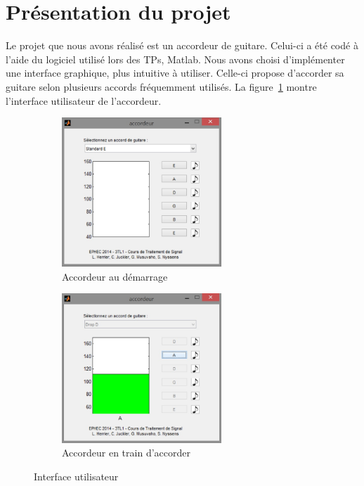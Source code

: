 \section{Présentation du projet}
Le projet que nous avons réalisé est un accordeur de guitare. Celui-ci a été codé à l'aide du logiciel utilisé lors des TPs, Matlab. Nous avons choisi d'implémenter une interface graphique, plus intuitive à utiliser. Celle-ci propose d'accorder sa guitare selon plusieurs accords fréquemment utilisés. La figure~\ref{interface} montre l'interface utilisateur de l'accordeur.

\begin{figure}[H]
\centering
\begin{subfigure}[b]{7cm}
	\includegraphics[width=6cm]{accordeur.jpg}
	\caption{Accordeur au démarrage}
\end{subfigure}
\begin{subfigure}[b]{7cm}
	\includegraphics[width=6cm]{accordeurOn.jpg}
	\caption{Accordeur en train d'accorder}
\end{subfigure}
\caption{Interface utilisateur}
\label{interface}
\end{figure}

